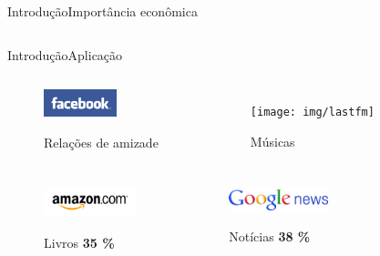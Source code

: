 \begin{frame}{Introdução}{Importância econômica}
\begin{columns}[c]
\end{columns}

\end{frame}


\begin{frame}{Introdução}{Aplicação}
\begin{columns}[c]


\begin{figure}[ht]
    \begin{center}
    \includegraphics[height=30px]{img/facebook}

    Relações de amizade
    \end{center}
\end{figure}


\begin{figure}[ht]
    \begin{center}
    \texttt{[image: img/lastfm]}

    Músicas
    \end{center}
\end{figure}
\end{columns}
\begin{columns}[b]


\begin{figure}[ht]
    \begin{center}
    \includegraphics[height=30px]{img/amazon}

    Livros \textbf{35 \%} \\
    \cite{amazon35}
    \end{center}
\end{figure}

\begin{figure}[ht]
    \begin{center}
    \includegraphics[height=23px]{img/google-news}

    Notícias \textbf{38 \%} \\
    \cite{das2007google}
    \end{center}
\end{figure}


\end{columns}
\end{frame}
